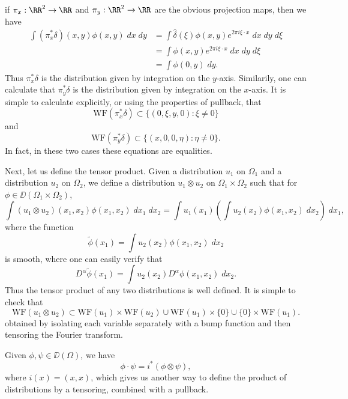 \begin{example}
    if $\pi_x: \RR^2 \to \RR$ and $\pi_y: \RR^2 \to \RR$ are the obvious projection maps, then we have
    \begin{align*}
        \int (\pi_x^* \delta)(x,y) \phi(x,y)\; dx\; dy &= \int \widehat{\delta}(\xi) \phi(x,y) e^{2 \pi i \xi \cdot x}\; dx\; dy\; d\xi\\
        &= \int \phi(x,y) e^{2 \pi i \xi \cdot x}\; dx\; dy\; d\xi\\
        &= \int \phi(0,y)\; dy.
    \end{align*}
    Thus $\pi_x^* \delta$ is the distribution given by integration on the $y$-axis. Similarily, one can calculate that $\pi_y^* \delta$ is the distribution given by integration on the $x$-axis. It is simple to calculate explicitly, or using the properties of pullback, that
    \[ \text{WF}(\pi_x^* \delta) \subset \{ (0,\xi,y,0) : \xi \neq 0 \} \]
    and
    \[ \text{WF}(\pi_y^* \delta) \subset \{ (x,0,0,\eta): \eta \neq 0 \}. \]
    In fact, in these two cases these equations are equalities.
\end{example}

Next, let us define the tensor product. Given a distribution $u_1$ on $\Omega_1$ and a distribution $u_2$ on $\Omega_2$, we define a distribution $u_1 \otimes u_2$ on $\Omega_1 \times \Omega_2$ such that for $\phi \in \DD(\Omega_1 \times \Omega_2)$,
%
\[ \int (u_1 \otimes u_2)(x_1,x_2) \phi(x_1,x_2)\; dx_1\; dx_2 = \int u_1(x_1) \left( \int u_2(x_2) \phi(x_1,x_2)\; dx_2 \right)\; dx_1, \]
%
where the function
%
\[ \tilde{\phi}(x_1) = \int u_2(x_2) \phi(x_1,x_2)\; dx_2 \]
%
is smooth, where one can easily verify that
%
\[ D^\alpha \tilde{\phi}(x_1) = \int u_2(x_2) D^\alpha \phi(x_1,x_2)\; dx_2. \]
%
Thus the tensor product of any two distributions is well defined. It is simple to check that
%
\[ \text{WF}(u_1 \otimes u_2) \subset \text{WF}(u_1) \times \text{WF}(u_2) \cup \text{WF}(u_1) \times \{ 0 \} \cup \{ 0 \} \times \text{WF}(u_1). \]
%
obtained by isolating each variable separately with a bump function and then tensoring the Fourier transform.

\begin{example}
    Given $\phi,\psi \in \DD(\Omega)$, we have
    \[ \phi \cdot \psi = i^*(\phi \otimes \psi), \]
    where $i(x) = (x,x)$, which gives us another way to define the product of distributions by a tensoring, combined with a pullback.
\end{example}

